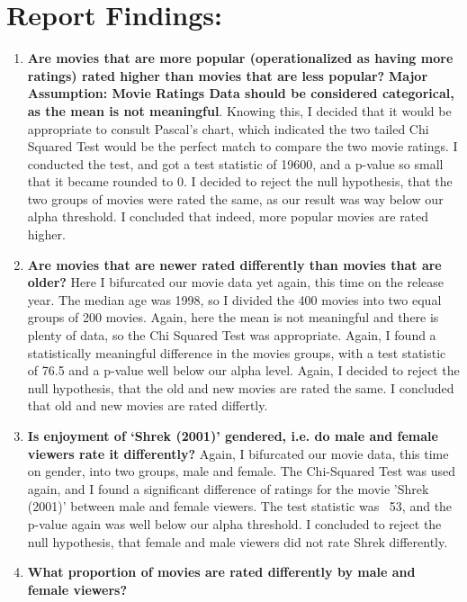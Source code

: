 \documentclass[12pt,twoside]{article}
\begin{document}
\section{Report Findings: }
\begin{enumerate}
    \item   \textbf{Are movies that are more popular (operationalized as having more ratings) rated higher than movies that are less popular? }
    \subitem \textbf{Major Assumption: Movie Ratings Data should be considered categorical, as the mean is not meaningful}. Knowing this, I decided that it would be appropriate to consult Pascal's chart, which indicated the two tailed Chi Squared Test would be the perfect match to compare the two movie ratings. I conducted the test, and got a test statistic of 19600, and a p-value so small that it became rounded to 0. I decided to reject the null hypothesis, that the two groups of movies were rated the same, as our result was way below our alpha threshold. I concluded that indeed, more popular movies are rated higher.
    \item \textbf{Are movies that are newer rated differently than movies that are older?}
    \subitem Here I bifurcated our movie data yet again, this time on the release year. The median age was 1998, so I divided the 400 movies into two equal groups of 200 movies. Again, here the mean is not meaningful and there is plenty of data, so the Chi Squared Test was appropriate. Again, I found a statistically meaningful difference in the movies groups, with a test statistic of 76.5 and a p-value well below our alpha level. Again, I decided to reject the null hypothesis, that the old and new movies are rated the same. I concluded that old and new movies are rated differtly. 
    \item \textbf{Is enjoyment of ‘Shrek (2001)’ gendered, i.e. do male and female viewers rate it differently? }
    \subitem
    Again, I bifurcated our movie data, this time on gender, into two groups, male and female. The Chi-Squared Test was used again, and I found a significant difference of ratings for the movie 'Shrek (2001)' between male and female viewers. The test statistic was ~53, and the p-value again was well below our alpha threshold. I concluded to reject the null hypothesis, that female and male viewers did not rate Shrek differently. 
    \item \textbf{What proportion of movies are rated differently by male and female viewers?}
    \subitem 

\end{enumerate}
\end{document}
